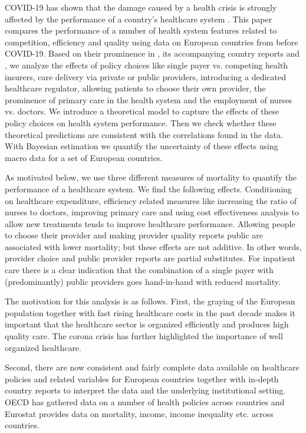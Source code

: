 \documentclass[12pt,english,a4paper]{article}
\begin{document}
COVID-19 has shown that the damage caused by a health crisis is strongly affected by the performance of a country's healthcare system \citep{OECD_2020}. This paper compares the performance of a number of health system features related to competition, efficiency and quality using data on European countries from before COVID-19. Based on their prominence in \cite{countryprofileReport}, its accompanying country reports and \citep{OECD_2020}, we analyze the effects of policy choices like single payer vs. competing health insurers, care delivery via private or public providers, introducing a dedicated healthcare regulator, allowing patients to choose their own provider, the prominence of primary care in the health system and the employment of nurses vs. doctors. We introduce a theoretical model to capture the effects of these policy choices on health system performance. Then we check whether these theoretical predictions are consistent with the correlations found in the data. With Bayesian estimation we quantify the uncertainty of these effects using macro data for a set of European countries.

As motivated below, we use three different measures of mortality to quantify the performance of a healthcare system. We find the following effects. Conditioning on healthcare expenditure, efficiency related measures like increasing the ratio of nurses to doctors, improving primary care and using cost effectiveness analysis to allow new treatments tends to improve healthcare performance. Allowing people to choose their provider and making provider quality reports public are associated with lower mortality; but these effects are not additive. In other words, provider choice and public provider reports are partial substitutes. For inpatient care there is a clear indication that the combination of a single payer with (predominantly) public providers goes hand-in-hand with reduced mortality.

The motivation for this analysis is as follows. First, the graying of the European population together with fast rising healthcare costs in the past decade makes it important that the healthcare sector is organized efficiently and produces high quality care. The corona crisis has further highlighted the importance of well organized healthcare.

Second, there are now consistent and fairly complete data available on healthcare policies and related variables for European countries together with in-depth country reports to interpret the data and the underlying institutional setting. OECD has gathered data on a number of health policies across countries and Eurostat provides data on mortality, income, income inequality etc. across countries.
\end{document}
